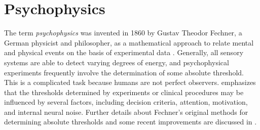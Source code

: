 
\section{Psychophysics}
\label{sec:Psychophysics}


The term \emph{psychophysics} was invented in 1860 by Gustav Theodor Fechner, a German physicist and philosopher, as a mathematical approach to relate mental and physical events on the basis of experimental data \cite{Treutwein1995}. Generally, all sensory systems are able to detect varying degrees of energy, and psychophysical experiments frequently involve the determination of some absolute threshold. This  is a complicated task because humans are not perfect observers. \citet{Lemma2005} emphasizes that the thresholds determined by experiments or clinical procedures may be influenced by several factors, including decision criteria, attention, motivation, and internal neural noise. Further details about Fechner's original methods for determining absolute thresholds and some recent improvements are discussed in \cite{Klein2001, Leek2001, Blake2005}.
